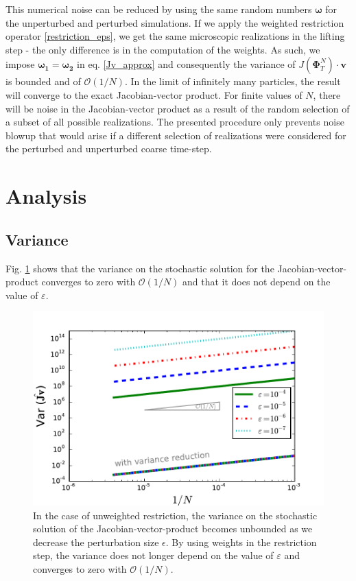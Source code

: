 \documentclass[]{article}
\newcommand{\cts}{\ensuremath{\boldsymbol{\Phi}^N_T}} %
\theoremstyle{definition}
\begin{document}
This numerical noise can be reduced by using the same random numbers $\boldsymbol{\omega}$ for the unperturbed and perturbed simulations. If we apply the weighted restriction operator \eqref{restriction_eps},  we get the same microscopic realizations in the lifting step - the only difference is in the computation of the weights. As such,  we impose $\boldsymbol{\omega_1} = \boldsymbol{\omega_2}$ in eq. \eqref{Jv_approx} and consequently the variance of $J(\cts) \cdot \mathbf{v}$ is bounded and of  $\mathcal{O}(1/ N)$.  In the limit of infinitely many particles, the result will converge to the exact Jacobian-vector product. For finite values of $N$, there will be noise in the Jacobian-vector product as a result of the random selection of a subset of all possible realizations. The presented procedure only prevents noise blowup that would arise if a different selection of realizations were considered for the perturbed and unperturbed coarse time-step.


\section{Analysis}
\subsection{Variance}

Fig. \ref{Var_N} shows that the variance on the stochastic solution for the Jacobian-vector-product converges to zero with $\mathcal{O}(1/ N)$ and that it does not depend on the value of $\varepsilon$.

\begin{figure}
\centering
\includegraphics[width=0.8\linewidth]{../Problems/Particles/checkSystem/plots/Var_N_eps_nw}
\caption[Effect of variance reduction]{In the case of unweighted restriction, the variance on the stochastic solution of the Jacobian-vector-product becomes unbounded as we decrease the perturbation size $\epsilon$. By using weights in the restriction step, the variance does not longer depend on the value of $\varepsilon$ and   converges to zero with $\mathcal{O}(1/ N)$.}
\label{Var_N}
\end{figure}
\end{document}
